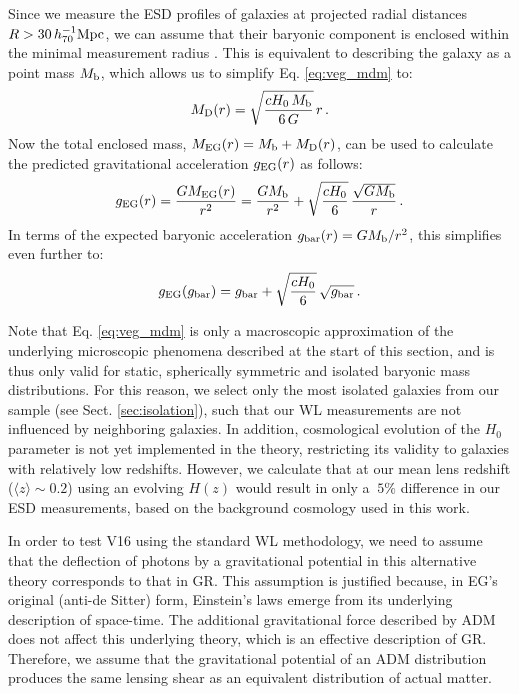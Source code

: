 \documentclass[usenatbib]{mnras}
\newcommand{\hsMpc}{\, h_{70}^{-1}{\rm{Mpc}} }
\newcommand{\un}[1]{_{\rm #1}}
\begin{document}
Since we measure the ESD profiles of galaxies at projected radial distances $R>30 \hsMpc$, we can assume that their baryonic component is enclosed within the minimal measurement radius \cite[see also][]{brouwer2017}. This is equivalent to describing the galaxy as a point mass $M\un{b}$, which allows us to simplify Eq. \ref{eq:veg_mdm} to:
\begin{equation}
M_{\rm D}(r)=\sqrt{\frac{cH_{0} \, M_{\rm b}}{6 \, G}} \, r \, .
\end{equation}
Now the total enclosed mass, $M\un{EG}(r) = M\un{b} + M\un{D}(r)$, can be used to calculate the predicted gravitational acceleration $g\un{EG}(r)$ as follows:
\begin{equation}
	g_{\rm EG}(r) = \frac{G M\un{EG}(r)}{r^2} = \frac{G M\un{b}}{r^2} + \sqrt{\frac{cH_{0}}{6}} \, \frac{\sqrt{G M_{\rm b}}}{r} \, .
\end{equation}
In terms of the expected baryonic acceleration $g\un{bar}(r) = G M\un{b}/r^2$, this simplifies even further to:
\begin{equation}
g_{\rm EG}(g\un{bar}) = g\un{bar} + \sqrt{\frac{cH_{0}}{6}} \, \sqrt{g\un{bar}} \, .
\end{equation}

Note that Eq. \ref{eq:veg_mdm} is only a macroscopic approximation of the underlying microscopic phenomena described at the start of this section, and is thus only valid for static, spherically symmetric and isolated baryonic mass distributions. For this reason, we select only the most isolated galaxies from our sample (see Sect. \ref{sec:isolation}), such that our WL measurements are not influenced by neighboring galaxies. In addition, cosmological evolution of the $H_0$ parameter is not yet implemented in the theory, restricting its validity to galaxies with relatively low redshifts. However, we calculate that at our mean lens redshift ($\langle z \rangle \sim 0.2$) using an evolving $H(z)$ would result in only a $~5\%$ difference in our ESD measurements, based on the background cosmology used in this work.

In order to test V16 using the standard WL methodology, we need to assume that the deflection of photons by a gravitational potential in this alternative theory corresponds to that in GR. This assumption is justified because, in EG's original (anti-de Sitter) form, Einstein's laws emerge from its underlying description of space-time. The additional gravitational force described by ADM does not affect this underlying theory, which is an effective description of GR. Therefore, we assume that the gravitational potential of an ADM distribution produces the same lensing shear as an equivalent distribution of actual matter.
\end{document}
